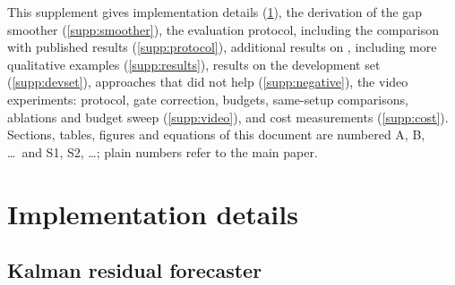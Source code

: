 
\noindent This supplement gives implementation details (\cref{supp:impl}), the derivation of the gap smoother
(\cref{supp:smoother}), the evaluation protocol, including the comparison with published results
(\cref{supp:protocol}), additional results on \flux, including more qualitative examples (\cref{supp:results}),
results on the development set (\cref{supp:devset}), approaches that did not help (\cref{supp:negative}), the video
experiments: protocol, gate correction, budgets, same-setup comparisons, ablations and budget sweep
(\cref{supp:video}), and cost measurements (\cref{supp:cost}). Sections, tables,
figures and equations of this document are numbered A, B, \dots\ and S1, S2, \dots; plain numbers refer to the main
paper.

\section{Implementation details}
\label{supp:impl}

\subsection{Kalman residual forecaster}
\label{supp:forecaster}

